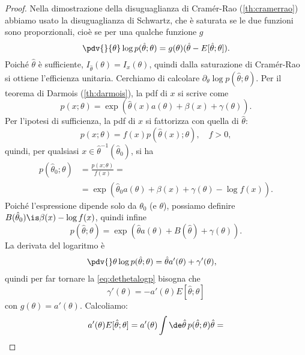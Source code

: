 \begin{proof}
	Nella dimostrazione della disuguaglianza di Cramér-Rao (\autoref{th:cramerrao})
	abbiamo usato la disuguaglianza di Schwartz,
	che è saturata se le due funzioni sono proporzionali,
	cioè se per una qualche funzione $g$
	\begin{equation}
		\label{eq:dethetalogp}
		\pdv{}{\theta}\log p(\hat\theta;\theta) = g(\theta) (\hat\theta-E[\hat\theta;\theta]).
	\end{equation}
	Poiché $\hat\theta$ è sufficiente, $I_{\hat\theta}(\theta)=I_x(\theta)$,
	quindi dalla saturazione di Cramér-Rao si ottiene l'efficienza unitaria.
	Cerchiamo di calcolare $\partial_\theta\log p(\hat\theta;\theta)$.
	Per il teorema di Darmois (\autoref{th:darmois}),
	la pdf di $x$ si scrive come
	\begin{equation*}
		p(x;\theta)
		= \exp \left( \hat\theta(x)a(\theta) + \beta(x) + \gamma(\theta) \right).
	\end{equation*}
	Per l'ipotesi di sufficienza, la pdf di $x$ si fattorizza con quella di $\hat\theta$:
	\begin{equation*}
		p(x;\theta)
		= f(x) p(\hat\theta(x);\theta), \quad f > 0,
	\end{equation*}
	quindi, per qualsiasi $x\in\hat\theta^{-1}(\hat\theta_0)$, si ha
	\begin{align*}
		p(\hat\theta_0;\theta)
		&= \frac{p(x;\theta)}{f(x)} = \\
		&= \exp \left( \hat\theta_0 a(\theta) + \beta(x) + \gamma(\theta) - \log f(x) \right).
	\end{align*}
	Poiché l'espressione dipende solo da $\theta_0$ (e $\theta$),
	possiamo definire $B(\hat\theta_0)\is\beta(x)-\log f(x)$,
	quindi infine
	\begin{equation*}
		p(\hat\theta;\theta)
		= \exp \left( \hat\theta a(\theta) + B(\hat\theta) + \gamma(\theta) \right).
	\end{equation*}
	La derivata del logaritmo è
	\begin{align*}
		\pdv{}\theta \log p(\hat\theta;\theta)
		&= \hat\theta a'(\theta) + \gamma'(\theta),
	\end{align*}
	quindi per far tornare la \eqref{eq:dethetalogp} bisogna che
	\begin{equation*}
		\gamma'(\theta) = -a'(\theta) E[\hat\theta;\theta]
	\end{equation*}
	con $g(\theta)=a'(\theta)$.
	Calcoliamo:
	\begin{align*}
		a'(\theta) E[\hat\theta;\theta]
		&= a'(\theta) \int\de\hat\theta\, p(\hat\theta;\theta) \hat\theta = \\

\end{align*}
\end{proof}
